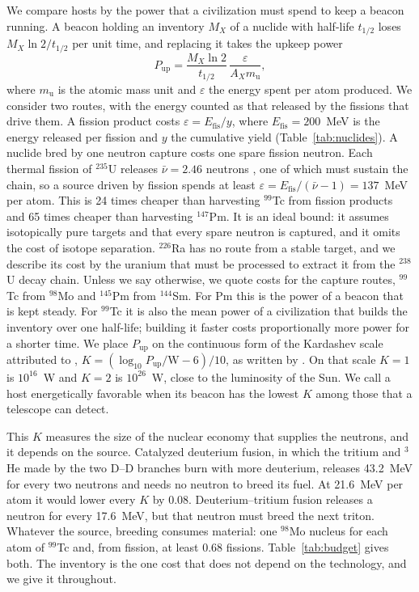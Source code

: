 \documentclass[final,5p]{elsarticle}
\begin{document}
We compare hosts by the power that a civilization must spend to keep a beacon running. A beacon holding an inventory $M_X$ of a nuclide with half-life $t_{1/2}$ loses $M_X \ln 2 / t_{1/2}$ per unit time, and replacing it takes the upkeep power
\begin{equation}
P_\mathrm{up} = \frac{M_X \ln 2}{t_{1/2}} \, \frac{\varepsilon}{A_X m_\mathrm{u}} ,
\label{eq:upkeep}
\end{equation}
where $m_\mathrm{u}$ is the atomic mass unit and $\varepsilon$ the energy spent per atom produced. We consider two routes, with the energy counted as that released by the fissions that drive them. A fission product costs $\varepsilon = E_\mathrm{fis}/y$, where $E_\mathrm{fis} = 200$~MeV is the energy released per fission and $y$ the cumulative yield (Table~\ref{tab:nuclides}). A nuclide bred by one neutron capture costs one spare fission neutron. Each thermal fission of $^{235}$U releases $\bar\nu = 2.46$ neutrons \citep{Diven1956}, one of which must sustain the chain, so a source driven by fission spends at least $\varepsilon = E_\mathrm{fis}/(\bar\nu - 1) = 137$~MeV per atom. This is 24 times cheaper than harvesting $^{99}$Tc from fission products and 65 times cheaper than harvesting $^{147}$Pm. It is an ideal bound: it assumes isotopically pure targets and that every spare neutron is captured, and it omits the cost of isotope separation. $^{226}$Ra has no route from a stable target, and we describe its cost by the uranium that must be processed to extract it from the $^{238}$U decay chain. Unless we say otherwise, we quote costs for the capture routes, $^{99}$Tc from $^{98}$Mo and $^{145}$Pm from $^{144}$Sm. For Pm this is the power of a beacon that is kept steady. For $^{99}$Tc it is also the mean power of a civilization that builds the inventory over one half-life; building it faster costs proportionally more power for a shorter time. We place $P_\mathrm{up}$ on the continuous form of the Kardashev scale attributed to \citet{Sagan1973}, $K = (\log_{10} P_\mathrm{up}/\mathrm{W} - 6)/10$, as written by \citet{Gray2020}. On that scale $K = 1$ is $10^{16}$~W and $K = 2$ is $10^{26}$~W, close to the luminosity of the Sun. We call a host energetically favorable when its beacon has the lowest $K$ among those that a telescope can detect.

This $K$ measures the size of the nuclear economy that supplies the neutrons, and it depends on the source. Catalyzed deuterium fusion, in which the tritium and $^{3}$He made by the two D--D branches burn with more deuterium, releases 43.2~MeV for every two neutrons and needs no neutron to breed its fuel. At 21.6~MeV per atom it would lower every $K$ by 0.08. Deuterium--tritium fusion releases a neutron for every 17.6~MeV, but that neutron must breed the next triton. Whatever the source, breeding consumes material: one $^{98}$Mo nucleus for each atom of $^{99}$Tc and, from fission, at least 0.68 fissions. Table~\ref{tab:budget} gives both. The inventory is the one cost that does not depend on the technology, and we give it throughout.
\end{document}
